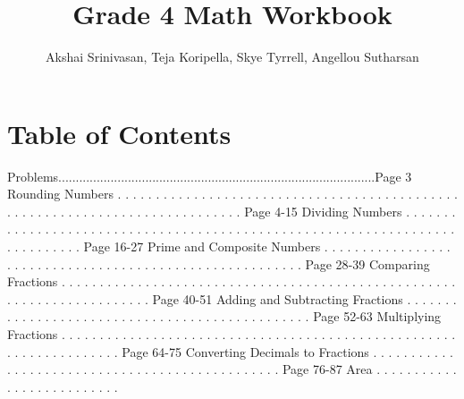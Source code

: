 \documentclass{article}%
\title{Grade 4 Math Workbook}%
\author{Akshai Srinivasan, Teja Koripella, Skye Tyrrell, Angellou Sutharsan}%
\date{}%
\begin{document}
%
\normalsize%
\maketitle%
\newpage%
\section{Table of Contents}%
\label{sec:TableofContents}%
Problems...........................................................................................Page 3%
\newline%
Rounding Numbers%
.%
.%
.%
.%
.%
.%
.%
.%
.%
.%
.%
.%
.%
.%
.%
.%
.%
.%
.%
.%
.%
.%
.%
.%
.%
.%
.%
.%
.%
.%
.%
.%
.%
.%
.%
.%
.%
.%
.%
.%
.%
.%
.%
.%
.%
.%
.%
.%
.%
.%
.%
.%
.%
.%
.%
.%
.%
.%
.%
.%
.%
.%
.%
.%
.%
.%
.%
.%
.%
.%
.%
.%
.%
.%
.%
.%
Page 4{-}15%
\newline%
Dividing Numbers%
.%
.%
.%
.%
.%
.%
.%
.%
.%
.%
.%
.%
.%
.%
.%
.%
.%
.%
.%
.%
.%
.%
.%
.%
.%
.%
.%
.%
.%
.%
.%
.%
.%
.%
.%
.%
.%
.%
.%
.%
.%
.%
.%
.%
.%
.%
.%
.%
.%
.%
.%
.%
.%
.%
.%
.%
.%
.%
.%
.%
.%
.%
.%
.%
.%
.%
.%
.%
.%
.%
.%
.%
.%
.%
.%
.%
Page 16{-}27%
\newline%
Prime and Composite Numbers%
.%
.%
.%
.%
.%
.%
.%
.%
.%
.%
.%
.%
.%
.%
.%
.%
.%
.%
.%
.%
.%
.%
.%
.%
.%
.%
.%
.%
.%
.%
.%
.%
.%
.%
.%
.%
.%
.%
.%
.%
.%
.%
.%
.%
.%
.%
.%
.%
.%
.%
.%
.%
.%
.%
.%
.%
Page 28{-}39%
\newline%
Comparing Fractions%
.%
.%
.%
.%
.%
.%
.%
.%
.%
.%
.%
.%
.%
.%
.%
.%
.%
.%
.%
.%
.%
.%
.%
.%
.%
.%
.%
.%
.%
.%
.%
.%
.%
.%
.%
.%
.%
.%
.%
.%
.%
.%
.%
.%
.%
.%
.%
.%
.%
.%
.%
.%
.%
.%
.%
.%
.%
.%
.%
.%
.%
.%
.%
.%
.%
.%
.%
.%
.%
.%
.%
Page 40{-}51%
\newline%
Adding and Subtracting Fractions%
.%
.%
.%
.%
.%
.%
.%
.%
.%
.%
.%
.%
.%
.%
.%
.%
.%
.%
.%
.%
.%
.%
.%
.%
.%
.%
.%
.%
.%
.%
.%
.%
.%
.%
.%
.%
.%
.%
.%
.%
.%
.%
.%
.%
.%
.%
.%
Page 52{-}63%
\newline%
Multiplying Fractions%
.%
.%
.%
.%
.%
.%
.%
.%
.%
.%
.%
.%
.%
.%
.%
.%
.%
.%
.%
.%
.%
.%
.%
.%
.%
.%
.%
.%
.%
.%
.%
.%
.%
.%
.%
.%
.%
.%
.%
.%
.%
.%
.%
.%
.%
.%
.%
.%
.%
.%
.%
.%
.%
.%
.%
.%
.%
.%
.%
.%
.%
.%
.%
.%
.%
.%
.%
Page 64{-}75%
\newline%
Converting Decimals to Fractions%
.%
.%
.%
.%
.%
.%
.%
.%
.%
.%
.%
.%
.%
.%
.%
.%
.%
.%
.%
.%
.%
.%
.%
.%
.%
.%
.%
.%
.%
.%
.%
.%
.%
.%
.%
.%
.%
.%
.%
.%
.%
.%
.%
.%
.%
.%
.%
Page 76{-}87%
\newline%
Area%
.%
.%
.%
.%
.%
.%
.%
.%
.%
.%
.%
.%
.%
.%
.%
.%
.%
.%
.%
.%
.%
.%
.%
.%
.%
.%
\end{document}
